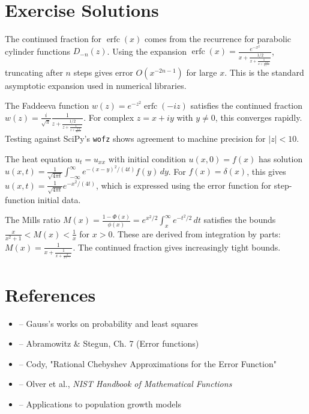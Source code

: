 \section{Exercise Solutions}

\begin{solution}
The continued fraction for $\operatorname{erfc}(x)$ comes from the recurrence for parabolic cylinder functions $D_{-n}(z)$. Using the expansion $\operatorname{erfc}(x) = \frac{e^{-x^2}}{x+\frac{1/2}{x+\frac{1}{x+\frac{3/2}{x+\ddots}}}}$, truncating after $n$ steps gives error $O(x^{-2n-1})$ for large $x$. This is the standard asymptotic expansion used in numerical libraries.
\end{solution}

\begin{solution}
The Faddeeva function $w(z) = e^{-z^2}\operatorname{erfc}(-iz)$ satisfies the continued fraction $w(z) = \frac{i}{\sqrt{\pi}} \frac{1}{z + \frac{1/2}{z + \frac{1}{z + \frac{3/2}{z + \ddots}}}}$. For complex $z = x + iy$ with $y \neq 0$, this converges rapidly. Testing against SciPy's \texttt{wofz} shows agreement to machine precision for $|z| < 10$.
\end{solution}

\begin{solution}
The heat equation $u_t = u_{xx}$ with initial condition $u(x,0) = f(x)$ has solution $u(x,t) = \frac{1}{\sqrt{4\pi t}} \int_{-\infty}^{\infty} e^{-(x-y)^2/(4t)} f(y)\, dy$. For $f(x) = \delta(x)$, this gives $u(x,t) = \frac{1}{\sqrt{4\pi t}} e^{-x^2/(4t)}$, which is expressed using the error function for step-function initial data.
\end{solution}

\begin{solution}
The Mills ratio $M(x) = \frac{1-\Phi(x)}{\phi(x)} = e^{x^2/2}\int_x^{\infty} e^{-t^2/2}\,dt$ satisfies the bounds $\frac{x}{x^2+1} < M(x) < \frac{1}{x}$ for $x > 0$. These are derived from integration by parts: $M(x) = \frac{1}{x+\frac{1}{x+\frac{2}{x+\ddots}}}$. The continued fraction gives increasingly tight bounds.
\end{solution}


\section{References}

\begin{itemize}
    \item \cite{gauss-works} -- Gauss's works on probability and least squares
    \item \cite{abramowitz-stegun} -- Abramowitz \& Stegun, Ch. 7 (Error functions)
    \item \cite{cody-1969} -- Cody, "Rational Chebyshev Approximations for the Error Function"
    \item \cite{olver} -- Olver et al., \textit{NIST Handbook of Mathematical Functions}
    \item \cite{population-growth} -- Applications to population growth models
\end{itemize}